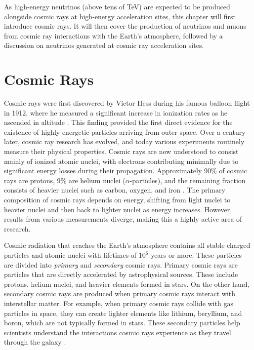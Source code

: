As high-energy neutrinos (above tens of TeV) are expected to be produced alongside cosmic rays at high-energy acceleration sites, this chapter will first introduce cosmic rays. It will then cover the production of neutrinos and muons from cosmic ray interactions with the Earth's atmosphere, followed by a discussion on neutrinos generated at cosmic ray acceleration sites.

\section{Cosmic Rays}
\label{sec:cosmic_rays}
Cosmic rays were first discovered by Victor Hess during his famous balloon flight in 1912, where he measured a significant increase in ionization rates as he ascended in altitude . This finding provided the first direct evidence for the existence of highly energetic particles arriving from outer space. Over a century later, cosmic ray research has evolved, and today various experiments routinely measure their physical properties. Cosmic rays are now understood to consist mainly of ionized atomic nuclei, with electrons contributing minimally due to significant energy losses during their propagation. Approximately 90\% of cosmic rays are protons, 9\% are helium nuclei ($\alpha$-particles), and the remaining fraction consists of heavier nuclei such as carbon, oxygen, and iron . The primary composition of cosmic rays depends on energy, shifting from light nuclei to heavier nuclei and then back to lighter nuclei as energy increases. However, results from various measurements diverge, making this a highly active area of research. 

Cosmic radiation that reaches the Earth's atmosphere contains all stable charged particles and atomic nuclei with lifetimes of $10^6$ years or more. These particles are divided into \emph{primary} and \emph{secondary} cosmic rays. Primary cosmic rays are particles that are directly accelerated by astrophysical sources. These include protons, helium nuclei, and heavier elements formed in stars. On the other hand, secondary cosmic rays are produced when primary cosmic rays interact with interstellar matter. For example, when primary cosmic rays  collide with gas particles in space, they can create lighter elements like lithium, beryllium, and boron, which are not typically formed in stars. These secondary particles help scientists understand the interactions cosmic rays experience as they travel through the galaxy .

